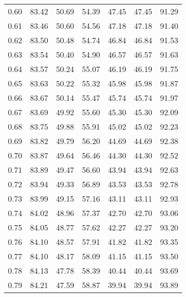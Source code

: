 \begin{tabular}{|c|c|c|c|c|c|c|}
      0.60 &     83.42 &     50.69 &      54.39 &   47.45 &      47.45 &         91.29 \\
      0.61 &     83.46 &     50.60 &      54.56 &   47.18 &      47.18 &         91.40 \\
      0.62 &     83.50 &     50.48 &      54.74 &   46.84 &      46.84 &         91.53 \\
      0.63 &     83.54 &     50.40 &      54.90 &   46.57 &      46.57 &         91.63 \\
      0.64 &     83.57 &     50.24 &      55.07 &   46.19 &      46.19 &         91.75 \\
      0.65 &     83.63 &     50.22 &      55.32 &   45.98 &      45.98 &         91.87 \\
      0.66 &     83.67 &     50.14 &      55.47 &   45.74 &      45.74 &         91.97 \\
      0.67 &     83.69 &     49.92 &      55.60 &   45.30 &      45.30 &         92.09 \\
      0.68 &     83.75 &     49.88 &      55.91 &   45.02 &      45.02 &         92.23 \\
      0.69 &     83.82 &     49.79 &      56.20 &   44.69 &      44.69 &         92.38 \\
      0.70 &     83.87 &     49.64 &      56.46 &   44.30 &      44.30 &         92.52 \\
      0.71 &     83.89 &     49.47 &      56.60 &   43.94 &      43.94 &         92.63 \\
      0.72 &     83.94 &     49.33 &      56.89 &   43.53 &      43.53 &         92.78 \\
      0.73 &     83.99 &     49.15 &      57.16 &   43.11 &      43.11 &         92.93 \\
      0.74 &     84.02 &     48.96 &      57.37 &   42.70 &      42.70 &         93.06 \\
      0.75 &     84.05 &     48.77 &      57.62 &   42.27 &      42.27 &         93.20 \\
      0.76 &     84.10 &     48.57 &      57.91 &   41.82 &      41.82 &         93.35 \\
      0.77 &     84.10 &     48.17 &      58.09 &   41.15 &      41.15 &         93.50 \\
      0.78 &     84.13 &     47.78 &      58.39 &   40.44 &      40.44 &         93.69 \\
      0.79 &     84.21 &     47.59 &      58.87 &   39.94 &      39.94 &         93.89 \\

\end{tabular}
